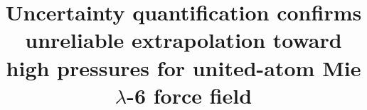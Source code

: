 \documentclass[preprint,letterpaper,floatfix,citeautoscript,aip,jcp]{revtex4-1}
\begin{document}
\title{Uncertainty quantification confirms unreliable extrapolation toward high pressures for united-atom Mie $\lambda$-6 force field}
\end{document}
